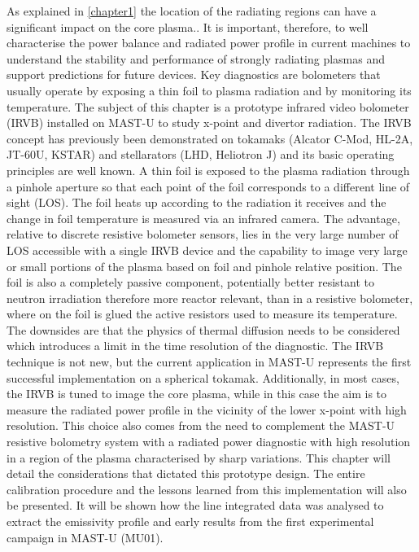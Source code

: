 As explained in \autoref{chapter1} the location of the radiating regions can have a significant impact on the core plasma.\cite{Reimold2015}. It is important, therefore, to well characterise the power balance and radiated power profile in current machines to understand the stability and performance of strongly radiating plasmas and support predictions for future devices. 
Key diagnostics are bolometers that usually operate by exposing a thin foil to plasma radiation and by monitoring its temperature. The subject of this chapter is a prototype infrared video bolometer (IRVB) installed on MAST-U to study x-point and divertor radiation.
The IRVB concept has previously been demonstrated on tokamaks (Alcator C-Mod\cite{Reinke2018a}, HL-2A\cite{Gao2013}, JT-60U\cite{Peterson2007}, KSTAR\cite{Jang2018,Peterson2018}) and stellarators (LHD\cite{Peterson2000,PETERSON2010}, Heliotron J\cite{Miyashita2021}) and its basic operating principles are well known. A thin foil is exposed to the plasma radiation through a pinhole aperture so that each point of the foil corresponds to a different line of sight (LOS). The foil heats up according to the radiation it receives and the change in foil temperature is measured via an infrared camera. The advantage, relative to discrete resistive bolometer sensors\cite{Mast1991}, lies in the very large number of LOS accessible with a single IRVB device and the capability to image very large or small portions of the plasma based on foil and pinhole relative position. The foil is also a completely passive component, potentially better resistant to neutron irradiation therefore more reactor relevant, than in a resistive bolometer, where on the foil is glued the active resistors used to measure its temperature. The downsides are that the physics of thermal diffusion needs to be considered which introduces a limit in the time resolution of the diagnostic. 
The IRVB technique is not new, but the current application in MAST-U represents the first successful implementation on a spherical tokamak. Additionally, in most cases, the IRVB is tuned to image the core plasma, while in this case the aim is to measure the radiated power profile in the vicinity of the lower x-point with high resolution. This choice also comes from the need to complement the MAST-U resistive bolometry system with a radiated power diagnostic with high resolution in a region of the plasma characterised by sharp variations.
This chapter will detail the considerations that dictated this prototype design. The entire calibration procedure and the lessons learned from this implementation will also be presented. It will be shown how the line integrated data was analysed to extract the emissivity profile and early results from the first experimental campaign in MAST-U (MU01).

